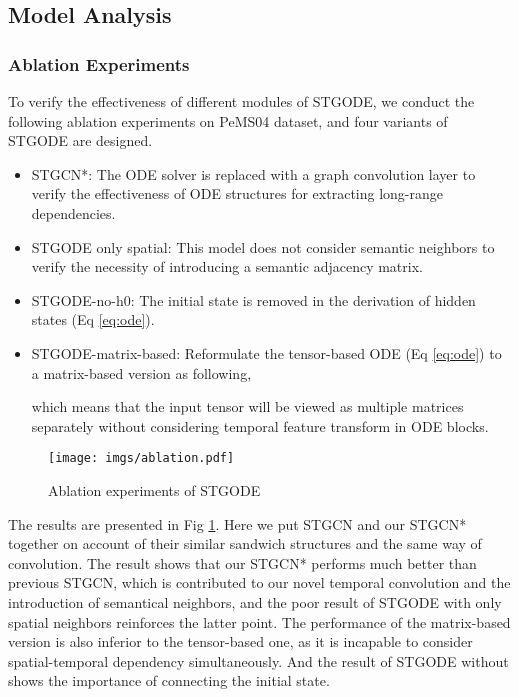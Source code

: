 \documentclass[sigconf]{acmart}
\theoremstyle{definition}
\begin{document}
\subsection{Model Analysis}
\subsubsection{Ablation Experiments}
To verify the effectiveness of different modules of STGODE, we conduct the following ablation experiments on PeMS04 dataset, and four variants of STGODE are designed.
\begin{itemize}
  \item STGCN*: The ODE solver is replaced with a graph convolution layer to verify the effectiveness of ODE structures for extracting long-range dependencies.
  \item STGODE only spatial: This model does not consider semantic neighbors to verify the necessity of introducing a semantic adjacency matrix.
  \item STGODE-no-h0: The initial state is removed in the derivation of hidden states (Eq \ref{eq:ode}).
  \item STGODE-matrix-based: Reformulate the tensor-based ODE (Eq \ref{eq:ode}) to a matrix-based version as following,
  
   which means that the input tensor will be viewed as multiple matrices separately without considering temporal feature transform in ODE blocks.
\end{itemize}

\begin{figure}[ht]
  \centering
  \texttt{[image: imgs/ablation.pdf]}
  \caption{Ablation experiments of STGODE}\label{fig:ablation}
\end{figure}
The results are presented in Fig \ref{fig:ablation}. Here we put STGCN and our STGCN* together on account of their similar sandwich structures and the same way of convolution. The result shows that our STGCN* performs much better than previous STGCN, which is contributed to our novel temporal convolution and the introduction of semantical neighbors, and the poor result of STGODE with only spatial neighbors reinforces the latter point. The performance of the matrix-based version is also inferior to the tensor-based one, as it is incapable to consider spatial-temporal dependency simultaneously. And the result of STGODE without  shows the importance of connecting the initial state.
\end{document}
